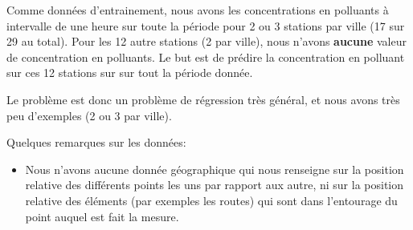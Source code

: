 Comme données d'entrainement, nous avons les concentrations en polluants à intervalle de une heure sur toute la période pour 2 ou 3 stations par ville (17 sur 29 au total).
Pour les 12 autre stations (2 par ville), nous n'avons \textbf{aucune} valeur de concentration en polluants.
Le but est de prédire la concentration en polluant sur ces 12 stations sur sur tout la période donnée.

Le problème est donc un problème de régression très général, et nous avons très peu d'exemples (2 ou 3 par ville).

Quelques remarques sur les données:
\begin{itemize}
  \item Nous n'avons aucune donnée géographique qui nous renseigne sur la position relative des différents points les uns par rapport aux autre, ni sur la position relative des éléments (par exemples les routes) qui sont dans l'entourage du point auquel est fait la mesure.
\end{itemize}

